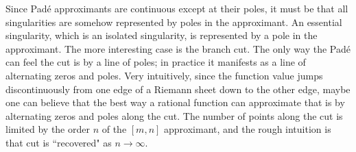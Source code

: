 Since Pad\'e approximants are continuous except at their poles, it must be that
all singularities are somehow represented by poles in the approximant. An
essential singularity, which is an isolated singularity, is represented by a
pole in the approximant. The more interesting case is the branch cut. The only
way the Pad\'e can feel the cut is by a line of poles; in practice it
manifests as a line of alternating zeros and poles. Very intuitively, since
the function value jumps discontinuously from one edge of a Riemann sheet down
to the other edge, maybe one can believe that the best way a rational function
can approximate that is by alternating zeros and poles along the cut. 
The number of points along the cut is limited by the order $n$ of the $[m,n]$ 
approximant, and the rough intuition is that cut is ``recovered" as $n\to\infty$.





